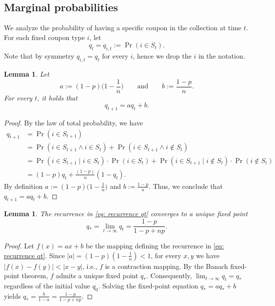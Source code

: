 \documentclass[11pt,a4paper]{article}
\newtheorem{lemma}[theorem]{Lemma}
\newcommand{\cond}{\mid}
\begin{document}
\subsection{Marginal probabilities}
\label{sec:marginalprobability}

We analyze the probability of having a specific coupon in the collection at time $t$.
For each fixed coupon type $i$, let
\begin{equation}\label{eq:qt}
	q_t = q_{i,t} := \Pr(i \in S_t).
\end{equation}
Note that by symmetry $q_{i,t} = q_t$ for every $i$, hence we drop the $i$ in the notation.

\begin{lemma}\label{lemma: recurrence}
Let
\[
    a := (1-p)\Big(1-\frac{1}{n}\Big)
    \qquad\text{and}\qquad
    b := \frac{1-p}{n}.
\]
For every $t$, it holds that
\begin{equation}\label{eq: recurrence qt}
	q_{t+1} = a q_t + b.
\end{equation}
\end{lemma}
\begin{proof}
By the law of total probability, we have
\begin{align*}
q_{t+1} &= \Pr(i \in S_{t+1}) \\
&= \Pr(i \in S_{t+1} \land i \in S_t) + \Pr(i \in S_{t+1} \land i \not\in S_t) \\
&= \Pr(i \in S_{t+1} \cond i \in S_t) \cdot \Pr(i \in S_t)
    + \Pr(i \in S_{t+1} \cond i \not\in S_t) \cdot \Pr(i \not\in S_t) \\
&= (1-p) q_t + \frac{(1-p)}{n} (1-q_t).
\end{align*}
By definition $a := (1-p)\big(1-\frac{1}{n}\big)$ and $b := \frac{1-p}{n}$. Thus, we conclude that $q_{t+1} = aq_t + b$.
\end{proof}

\begin{lemma}\label{lemma: fixed point}
The recurrence in \cref{eq: recurrence qt} converges to a unique fixed point
\begin{equation}\label{eq: fixed point q*}
	q_* = \lim_{t \rightarrow \infty } q_t = \frac{1-p}{1-p+np}.
\end{equation}
\end{lemma}
\begin{proof}
Let $f(x)=ax+b$ be the mapping defining the recurrence in \cref{eq: recurrence qt}.
Since $|a|=(1-p)(1-\frac{1}{n})<1$, for every $x,y$ we have $|f(x)-f(y)| < |x-y|$, i.e., $f$ is a contraction mapping.
By the Banach fixed-point theorem, $f$ admits a unique fixed point $q_*$.
Consequently, $\lim_{t \rightarrow \infty } q_t = q_*$ regardless of the initial value $q_0$.
Solving the fixed-point equation $q_{*}=aq_{*}+b$ yields $q_* = \frac{b}{1-a} = \frac{1-p}{1-p+np}$.
\end{proof}
\end{document}
